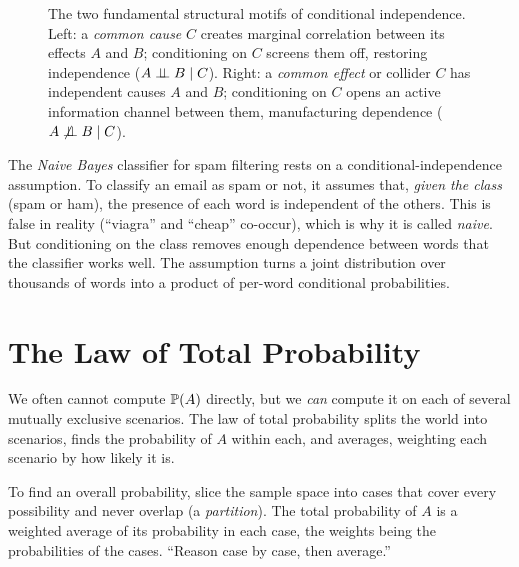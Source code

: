 \begin{figure}[H]
\caption{The two fundamental structural motifs of conditional independence. Left: a \emph{common cause} $C$ creates marginal correlation between its effects $A$ and $B$; conditioning on $C$ screens them off, restoring independence ($A \indep B \given C$). Right: a \emph{common effect} or collider $C$ has independent causes $A$ and $B$; conditioning on $C$ opens an active information channel between them, manufacturing dependence ($A \not\indep B \given C$).}
\label{ch04:fig-cond-indep-motifs}
\end{figure}

\begin{applicationbox}
The \emph{Naive Bayes} classifier for spam filtering rests on a conditional-independence assumption. To classify an email as spam or not, it assumes that, \emph{given the class} (spam or ham), the presence of each word is independent of the others. This is false in reality (``viagra'' and ``cheap'' co-occur), which is why it is called \emph{naive}. But conditioning on the class removes enough dependence between words that the classifier works well. The assumption turns a joint distribution over thousands of words into a product of per-word conditional probabilities.
\end{applicationbox}

\section{The Law of Total Probability}
\label{ch04:total-prob}

We often cannot compute $\P(A)$ directly, but we \emph{can} compute it on each of several mutually exclusive scenarios. The law of total probability splits the world into scenarios, finds the probability of $A$ within each, and averages, weighting each scenario by how likely it is.

\begin{intuitionbox}
To find an overall probability, slice the sample space into cases that cover every possibility and never overlap (a \emph{partition}). The total probability of $A$ is a weighted average of its probability in each case, the weights being the probabilities of the cases. ``Reason case by case, then average.''
\end{intuitionbox}

